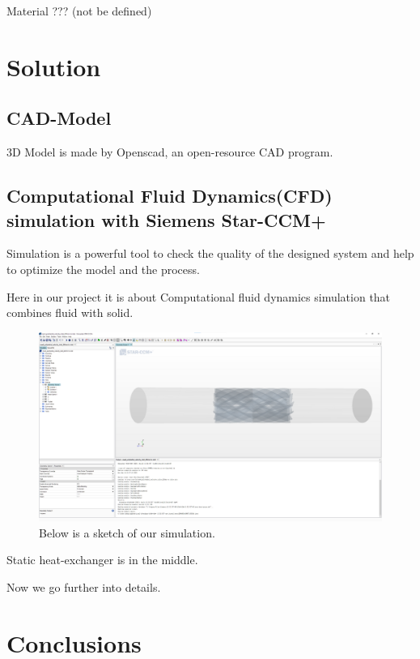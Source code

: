 \documentclass[journal,article,submit,moreauthors,pdftex]{Definitions/mdpi}
\begin{document}
Material ??? (not be defined)


\section{Solution}
\subsection{CAD-Model}

3D Model is made by Openscad, an open-resource CAD program.

\subsection{Computational Fluid Dynamics(CFD) simulation with Siemens Star-CCM+}
Simulation is a powerful tool to check the quality of the designed system and help to optimize the model and the process. 

Here in our project it is about Computational fluid dynamics simulation that combines fluid with solid. 

\begin{figure}[h]
\begin{center}
\centerline{\includegraphics[width=\textwidth]{./docu_pictures/sketch.png}}
\end{center}
\caption{Below is a sketch of our simulation.}
\label{simulation-sketch}
\end{figure}

Static heat-exchanger is in the middle. 

Now we go further into details.


\section{Conclusions}
\end{document}
